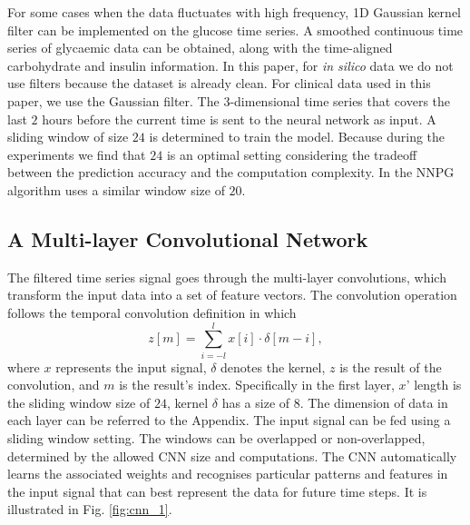 \documentclass[a4paper, 10 pt, twocolumn]{IEEEtran}
\begin{document}
For some cases when the data fluctuates with high frequency, 1D Gaussian kernel filter {can be implemented on the glucose time series. A smoothed continuous time series of glycaemic data can be obtained, along with} the
time-aligned carbohydrate and insulin information.
 In this paper, for \emph{in silico} data we do not use filters  because the dataset is already clean. For clinical data used in this paper, we use the Gaussian filter. The 3-dimensional time series that covers the last
 $2$ hours before the current time is sent to the neural network as input. A sliding window of size $24$ is determined to train the model.  {Because during the experiments we find that $24$ is an optimal setting
 considering the tradeoff between the prediction accuracy and the computation complexity. In \cite{perez-ArtiNN2010} the NNPG algorithm uses a similar window size of $20$. }


\subsection{A Multi-layer Convolutional Network}

The filtered time series signal goes through the multi-layer convolutions,  {which transform} the input data into a set of feature vectors. The convolution operation follows the temporal convolution definition in which
\begin{equation}\label{eq:conv}
  z[m] = \sum_{i = -l}^{l} x[i] \cdot \delta[m-i],
\end{equation}
where $x$ represents the input signal, $\delta$ denotes the kernel,  {$z$ is the result of the convolution, and $m$ is the result's index. Specifically in the first layer, $x$' length is the sliding window size of $24$,
kernel $\delta$ has a size of $8$.  The dimension of data in each layer can be referred to the Appendix.}
The input signal can be fed
using a sliding window setting. The windows can be overlapped or non-overlapped, determined by the allowed CNN size and computations. The CNN automatically learns the associated weights and recognises particular patterns
and features in the input signal that can best represent the data for future time steps.
It is illustrated in Fig. \ref{fig:cnn_1}.
\end{document}
